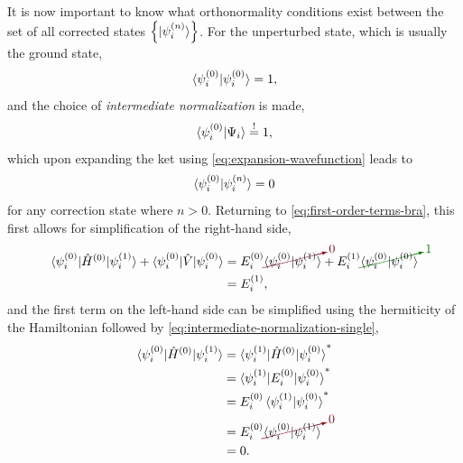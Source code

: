 \documentclass[%
class = book,%
crop = false,%
float = true,%
multi = true,%
preview = false,%
]{standalone}
\begin{document}
It is now important to know what orthonormality conditions exist between the set of all corrected states \(\left\{\ket{\psi_{i}^{(n)}}\right\}\). For the unperturbed state, which is usually the \hf{} ground state,
\begin{equation}
  \label{eq:hf-normalization}
  \braket{\psi_{i}^{(0)}|\psi_{i}^{(0)}} = 1,
\end{equation}
and the choice of \emph{intermediate normalization} is made,
\begin{equation}
  \label{eq:intermediate-normalization}
  \braket{\psi_{i}^{(0)}|\Psi_{i}} \overset{!}{=} 1,
\end{equation}
which upon expanding the ket using \eqref{eq:expansion-wavefunction} leads to
\begin{equation}
  \label{eq:intermediate-normalization-single}
  \braket{\psi_{i}^{(0)}|\psi_{i}^{(n)}} = 0
\end{equation}
for any correction state where \(n > 0\). Returning to \eqref{eq:first-order-terms-bra}, this first allows for simplification of the right-hand side,
\begin{equation}
  \label{eq:first-order-terms-first-simplification}
  \begin{aligned}
    \braket{\psi_{i}^{(0)} | \hat{H}^{(0)} | \psi_{i}^{(1)}} + \braket{\psi_{i}^{(0)} | \hat{V} | \psi_{i}^{(0)}} &= E_{i}^{(0)} \Ccancelto[carmine]{0}{\braket{\psi_{i}^{(0)} | \psi_{i}^{(1)}}} + E_{i}^{(1)} \Ccancelto[Green]{1}{\braket{\psi_{i}^{(0)} | \psi_{i}^{(0)}}} \\
    &= E_{i}^{(1)},
  \end{aligned}
\end{equation}
and the first term on the left-hand side can be simplified using the hermiticity of the Hamiltonian followed by \eqref{eq:intermediate-normalization-single},
\begin{equation}
  \label{eq:hermiticity}
  \begin{aligned}
    \braket{\psi_{i}^{(0)} | \hat{H}^{(0)} | \psi_{i}^{(1)}} &= \braket{\psi_{i}^{(1)} | \hat{H}^{(0)} | \psi_{i}^{(0)}}^{*} \\
    &= \braket{\psi_{i}^{(1)} | E_{i}^{(0)} | \psi_{i}^{(0)}}^{*} \\
    &= E_{i}^{(0)} \braket{\psi_{i}^{(1)} | \psi_{i}^{(0)}}^{*} \\
    &= E_{i}^{(0)} \Ccancelto[carmine]{0}{\braket{\psi_{i}^{(0)} | \psi_{i}^{(1)}}} \\
    &= 0.
  \end{aligned}
\end{equation}
\end{document}
